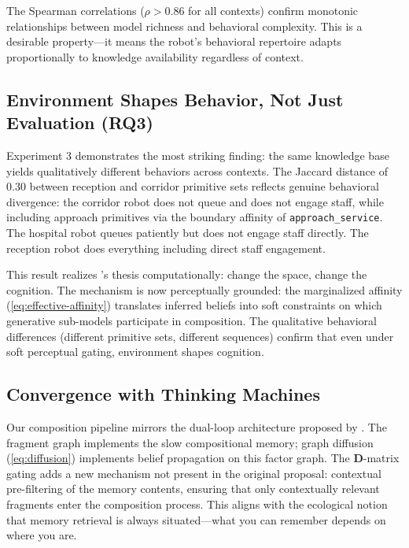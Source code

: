 \documentclass[11pt,a4paper]{article}
\newcommand{\D}{\mathbf{D}}
\begin{document}
The Spearman correlations ($\rho > 0.86$ for all contexts) confirm monotonic relationships between model richness and behavioral complexity.  This is a desirable property---it means the robot's behavioral repertoire adapts proportionally to knowledge availability regardless of context.

\subsection{Environment Shapes Behavior, Not Just Evaluation (RQ3)}

Experiment 3 demonstrates the most striking finding: the same knowledge base yields qualitatively different behaviors across contexts.  The Jaccard distance of 0.30 between reception and corridor primitive sets reflects genuine behavioral divergence: the corridor robot does not queue and does not engage staff, while including approach primitives via the boundary affinity of \texttt{approach\_service}.  The hospital robot queues patiently but does not engage staff directly.  The reception robot does everything including direct staff engagement.

This result realizes \citeauthor{lefebvre1991production}'s \citeyearpar{lefebvre1991production} thesis computationally: change the space, change the cognition.  The mechanism is now perceptually grounded: the marginalized affinity (\cref{eq:effective-affinity}) translates inferred beliefs into soft constraints on which generative sub-models participate in composition.  The qualitative behavioral differences (different primitive sets, different sequences) confirm that even under soft perceptual gating, environment shapes cognition.

\subsection{Convergence with Thinking Machines}

Our composition pipeline mirrors the dual-loop architecture proposed by \citet{nair2026thinking}.  The fragment graph implements the slow compositional memory; graph diffusion (\cref{eq:diffusion}) implements belief propagation on this factor graph.  The $\D$-matrix gating adds a new mechanism not present in the original proposal: contextual pre-filtering of the memory contents, ensuring that only contextually relevant fragments enter the composition process.  This aligns with the ecological notion that memory retrieval is always situated---what you can remember depends on where you are.
\end{document}
